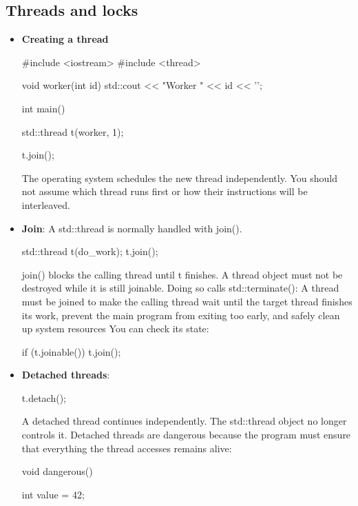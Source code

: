 \documentclass{report}
\begin{document}
    \subsection{Threads and locks}
    \begin{itemize}
        \item \textbf{Creating a thread}
            \bigbreak \noindent 
            \begin{cppcode}
                #include <iostream>
                #include <thread>

                void worker(int id) {
                    std::cout << "Worker " << id << '\n';
                }

                int main() {
                    std::thread t(worker, 1);

                    t.join();
                }
            \end{cppcode}
            \bigbreak \noindent 
            The operating system schedules the new thread independently. You should not assume which thread runs first or how their instructions will be interleaved.
        \item \textbf{Join}: A std::thread is normally handled with join().
            \bigbreak \noindent 
            \begin{cppcode}
                std::thread t(do_work);
                t.join();
            \end{cppcode}
            \bigbreak \noindent 
            join() blocks the calling thread until t finishes. A thread object must not be destroyed while it is still joinable. Doing so calls std::terminate():
            \bigbreak \noindent 
            A thread must be joined to make the calling thread wait until the target thread finishes its work, prevent the main program from exiting too early, and safely clean up system resources
            \bigbreak \noindent 
            You can check its state:
            \bigbreak \noindent 
            \begin{cppcode}
            if (t.joinable())
                t.join();
            \end{cppcode}
        \item \textbf{Detached threads}:
            \bigbreak \noindent 
            \begin{cppcode}
            t.detach();
            \end{cppcode}
            \bigbreak \noindent 
            A detached thread continues independently. The std::thread object no longer controls it.
            \bigbreak \noindent 
            Detached threads are dangerous because the program must ensure that everything the thread accesses remains alive:
            \bigbreak \noindent 
            \begin{cppcode}
                void dangerous() {
                    int value = 42;

}
\end{cppcode}
\end{itemize}
\end{document}
